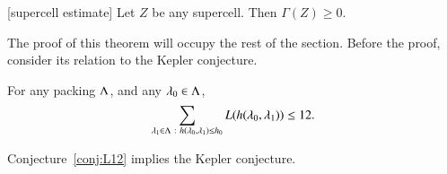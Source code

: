 \begin{theorem}[supercell estimate]\label{lemma:superineq} 
Let $Z$ be any supercell.  Then $\Gamma(Z)\ge 0$.
\end{theorem}

The proof of this theorem will occupy the rest of the section.  Before the proof, consider its relation to the Kepler conjecture.


\begin{conjecture}\label{conj:L12} For any packing $\Lambda$, and
any $\lambda_0\in\Lambda$, 
\begin{equation}\label{eqn:L12}
\sum_{\lambda_1\in\Lambda\ :\  h(\lambda_0,\lambda_1)\le {h_0}} L(h(\lambda_0,\lambda_1)) \le 12.
\end{equation}
\end{conjecture}




\begin{theorem}\label{theorem:mk2}
Conjecture~\ref{conj:L12} implies the Kepler conjecture.
\end{theorem}

